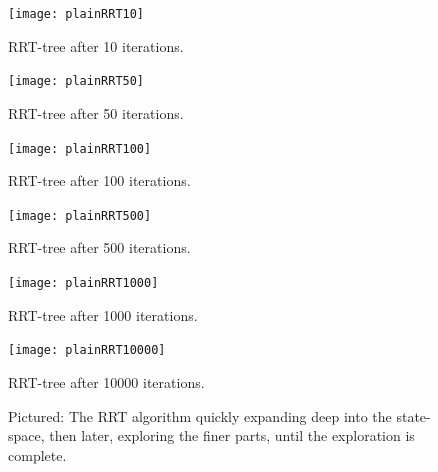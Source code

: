 \begin{figure}
  \centering
  \begin{minipage}[b]{0.3\textwidth}
    \texttt{[image: plainRRT10]}
    \caption{RRT-tree after 10 iterations.}
  \end{minipage}
  \begin{minipage}[b]{0.3\textwidth}
    \texttt{[image: plainRRT50]}
    \caption{RRT-tree after 50 iterations.}
  \end{minipage}
  \begin{minipage}[b]{0.3\textwidth}
    \texttt{[image: plainRRT100]}
    \caption{RRT-tree after 100 iterations.}
  \end{minipage}
  \newline %
  \begin{minipage}[b]{0.3\textwidth}
    \texttt{[image: plainRRT500]}
    \caption{RRT-tree after 500 iterations.}
  \end{minipage}
  \begin{minipage}[b]{0.3\textwidth}
    \texttt{[image: plainRRT1000]}
    \caption{RRT-tree after 1000 iterations.}
  \end{minipage}
  \begin{minipage}[b]{0.3\textwidth}
    \texttt{[image: plainRRT10000]}
    \caption{RRT-tree after 10000 iterations.}
  \end{minipage}
  \caption{Pictured: The \ac{RRT} algorithm quickly expanding deep into the
    state-space, then later, exploring the finer parts, until the exploration is
    complete.}
  \label{fig:rrt-expansion}
\end{figure}


